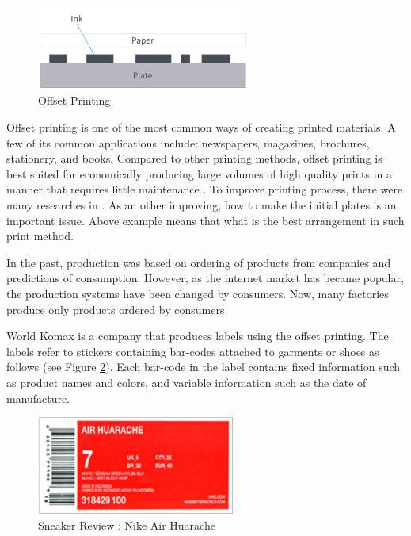 \documentclass[a4paper]{amsart}
\numberwithin{equation}{section} %
\numberwithin{figure}{section} %
\numberwithin{table}{section}
\theoremstyle{plain}
\theoremstyle{definition}
\theoremstyle{plain}
\theoremstyle{plain}
\theoremstyle{plain}
\theoremstyle{plain}
\theoremstyle{plain}
\begin{document}
\begin{figure}[h!]
	\centering
	\includegraphics[width=7cm]{OffsetPrint.pdf}
	\caption{Offset Printing}
	\label{fig:OffsetPrint}
\end{figure}

Offset printing is one of the most common ways of creating printed materials. A few of its common applications include: newspapers, magazines, brochures, stationery, and books. Compared to other printing methods, offset printing is best suited for economically producing large volumes of high quality prints in a manner that requires little maintenance \cite{Kipphan2001}. 
To improve printing process, there were many researches in \cite{AlChan, Muscle, Carmo}.
As an other improving, how to make the initial plates is an important issue. Above example means that what is the best arrangement in such print method.

In the past, production was based on ordering of products from companies and predictions of consumption. 
However, as the internet market has became popular, the production systems have been changed by consumers. 
Now, many factories produce only products ordered by consumers.

World Komax is a company that produces labels using the offset printing. The labels refer to stickers containing bar-codes attached to garments or shoes as follows (see Figure \ref{fig:AirHuarache}). Each bar-code in the label contains fixed information such as product names and colors, and variable information such as the date of manufacture.

\begin{figure}[h!]
	\centering
	\includegraphics[width=6.5cm]{AirHuarache.pdf}
	\caption{Sneaker Review : Nike Air Huarache}
	\label{fig:AirHuarache}       %
\end{figure}
\end{document}
